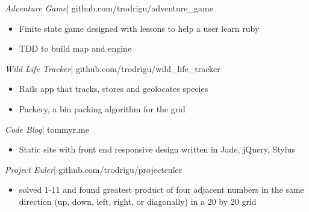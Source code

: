 \documentclass[margin]{res}
\begin{document}
\begin{resume}
  {\sl Adventure Game}|
  github.com/trodrigu/adventure\_game
  \begin{itemize}
      \item Finite state game designed with lessons to help a user learn ruby
      \item TDD to build map and engine 
  \end{itemize}

  {\sl Wild Life Tracker}| 
  github.com/trodrigu/wild\_life\_tracker
  \begin{itemize}
      \item Rails app that tracks, stores and geolocates species
      \item Packery, a bin packing algorithm for the grid
  \end{itemize}

  {\sl Code Blog}| 
  tommyr.me
  \begin{itemize}
      \item Static site with front end responsive design written in Jade, jQuery, Stylus
  \end{itemize}

  {\sl Project Euler}|
  github.com/trodrigu/projecteuler
  \begin{itemize}
    \item solved 1-11 and found greatest product of four adjacent numbers in the same direction (up, down, left, right, or diagonally) in a 20 by 20 grid
  \end{itemize}


\end{resume}
\end{document}
